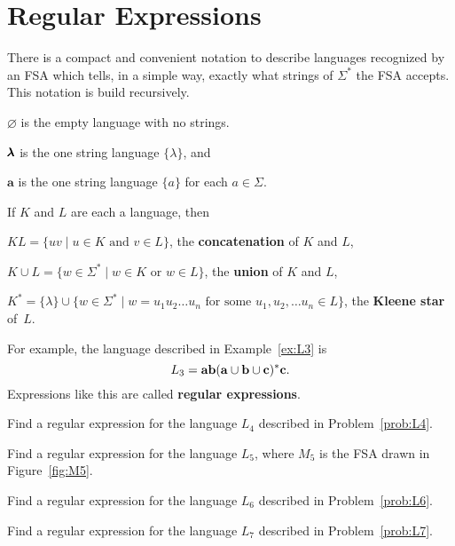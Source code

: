 \section{Regular Expressions}

There is a compact and convenient notation to describe languages recognized by an FSA which tells, in a simple way, exactly what strings of $\Sigma^*$ the FSA accepts.  This notation is build recursively.
\begin{description}
   \item $\pmb \varnothing$ is the empty language with no strings.
   \item $\pmb \lambda$ is the one string language $\{\lambda\}$, and
   \item $\mathbf{a}$ is the one string language $\{a\}$ for each $a\in \Sigma$.
\end{description}
\nin If $K$ and $L$ are each a language, then
\begin{description}
   \item $KL = \{uv \mid u\in K \mbox{ and } v\in L\}$, the \textbf{concatenation} of $K$ and $L$,
   \item $K\cup L = \{w \in \Sigma^* \mid w\in K \mbox{ or } w \in L\}$, the \textbf{union} of $K$ and $L$,
   \item $K^* = \{\lambda\} \cup\{w\in \Sigma^* \mid w=u_1u_2\dots u_n \mbox{ for some } u_1, u_2, \dots u_n \in L\}$, the \textbf{Kleene star} of~$L$.
 \end{description}
\nin For example, the  language described in Example~\ref{ex:L3} is $$L_3 = \mathbf a\mathbf b(\mathbf a\cup \mathbf b\cup \mathbf c)^*\mathbf c.$$ Expressions like this are called \textbf{regular expressions}.


\begin{prb}
Find a regular expression for the language $L_4$ described in Problem~\ref{prob:L4}.
\end{prb}

\begin{prb}
Find a regular expression for the language $L_5$, where $M_5$ is the FSA drawn in Figure~\ref{fig:M5}.
\end{prb}

\begin{prb}
Find a regular expression for the language $L_6$ described in Problem~\ref{prob:L6}.
\end{prb}

\begin{prb}
Find a regular expression for the language $L_7$ described in Problem~\ref{prob:L7}.
\end{prb}

